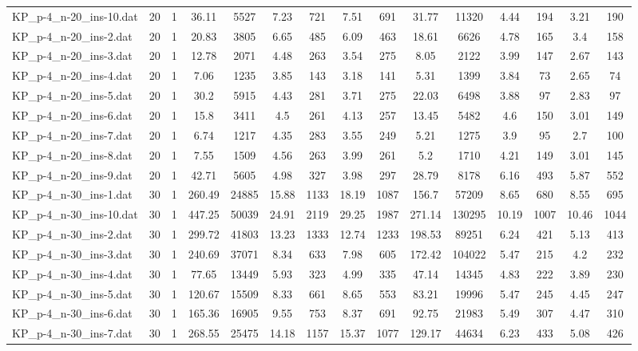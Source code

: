 \begin{table}[!ht]
{\begin{tabular}{lcccccccccccccc}
KP\_p-4\_n-20\_ins-10.dat & 20 & 1 & 36.11 & 5527 & 7.23 & 721 & 7.51 & 691 & 31.77 & 11320 & 4.44 & 194 & 3.21 & 190 \\
KP\_p-4\_n-20\_ins-2.dat & 20 & 1 & 20.83 & 3805 & 6.65 & 485 & 6.09 & 463 & 18.61 & 6626 & 4.78 & 165 & 3.4 & 158 \\
KP\_p-4\_n-20\_ins-3.dat & 20 & 1 & 12.78 & 2071 & 4.48 & 263 & 3.54 & 275 & 8.05 & 2122 & 3.99 & 147 & 2.67 & 143 \\
KP\_p-4\_n-20\_ins-4.dat & 20 & 1 & 7.06 & 1235 & 3.85 & 143 & 3.18 & 141 & 5.31 & 1399 & 3.84 & 73 & 2.65 & 74 \\
KP\_p-4\_n-20\_ins-5.dat & 20 & 1 & 30.2 & 5915 & 4.43 & 281 & 3.71 & 275 & 22.03 & 6498 & 3.88 & 97 & 2.83 & 97 \\
KP\_p-4\_n-20\_ins-6.dat & 20 & 1 & 15.8 & 3411 & 4.5 & 261 & 4.13 & 257 & 13.45 & 5482 & 4.6 & 150 & 3.01 & 149 \\
KP\_p-4\_n-20\_ins-7.dat & 20 & 1 & 6.74 & 1217 & 4.35 & 283 & 3.55 & 249 & 5.21 & 1275 & 3.9 & 95 & 2.7 & 100 \\
KP\_p-4\_n-20\_ins-8.dat & 20 & 1 & 7.55 & 1509 & 4.56 & 263 & 3.99 & 261 & 5.2 & 1710 & 4.21 & 149 & 3.01 & 145 \\
KP\_p-4\_n-20\_ins-9.dat & 20 & 1 & 42.71 & 5605 & 4.98 & 327 & 3.98 & 297 & 28.79 & 8178 & 6.16 & 493 & 5.87 & 552 \\
KP\_p-4\_n-30\_ins-1.dat & 30 & 1 & 260.49 & 24885 & 15.88 & 1133 & 18.19 & 1087 & 156.7 & 57209 & 8.65 & 680 & 8.55 & 695 \\
KP\_p-4\_n-30\_ins-10.dat & 30 & 1 & 447.25 & 50039 & 24.91 & 2119 & 29.25 & 1987 & 271.14 & 130295 & 10.19 & 1007 & 10.46 & 1044 \\
KP\_p-4\_n-30\_ins-2.dat & 30 & 1 & 299.72 & 41803 & 13.23 & 1333 & 12.74 & 1233 & 198.53 & 89251 & 6.24 & 421 & 5.13 & 413 \\
KP\_p-4\_n-30\_ins-3.dat & 30 & 1 & 240.69 & 37071 & 8.34 & 633 & 7.98 & 605 & 172.42 & 104022 & 5.47 & 215 & 4.2 & 232 \\
KP\_p-4\_n-30\_ins-4.dat & 30 & 1 & 77.65 & 13449 & 5.93 & 323 & 4.99 & 335 & 47.14 & 14345 & 4.83 & 222 & 3.89 & 230 \\
KP\_p-4\_n-30\_ins-5.dat & 30 & 1 & 120.67 & 15509 & 8.33 & 661 & 8.65 & 553 & 83.21 & 19996 & 5.47 & 245 & 4.45 & 247 \\
KP\_p-4\_n-30\_ins-6.dat & 30 & 1 & 165.36 & 16905 & 9.55 & 753 & 8.37 & 691 & 92.75 & 21983 & 5.49 & 307 & 4.47 & 310 \\
KP\_p-4\_n-30\_ins-7.dat & 30 & 1 & 268.55 & 25475 & 14.18 & 1157 & 15.37 & 1077 & 129.17 & 44634 & 6.23 & 433 & 5.08 & 426 \\

\end{tabular}}
\end{table}
